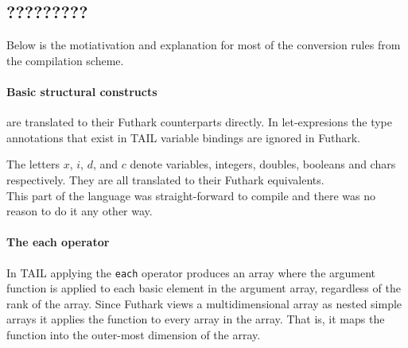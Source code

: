 \documentclass[11pt]{article}
\begin{document}
\subsection{?????????}
Below is the motiativation and explanation for most of the conversion rules from the compilation scheme. 

%



\paragraph{Basic structural constructs} are translated to their Futhark counterparts directly.
In let-expresions the type annotations that exist in TAIL variable bindings are ignored in Futhark. 

The letters $x$, $i$, $d$, and $c$ denote variables, integers, doubles, booleans and chars respectively.
They are all translated to their Futhark equivalents.\\

This part of the language was straight-forward to compile and there was no reason to do it any other way.

\paragraph{The each operator} 

In TAIL applying the {\tt each} operator produces an array where the argument function is applied to each basic element in the
argument array, regardless of the rank of the array.
Since Futhark views a multidimensional array as nested simple arrays it applies the function to every array in the array.
That is, it maps the function into the outer-most dimension of the array\cite{TroelsHenriksen}.
 
\end{document}
